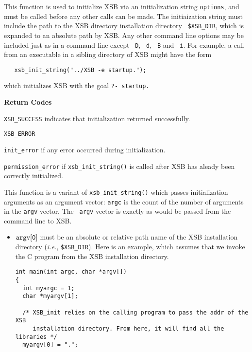 \begin{description}

 This function is used to initialize
XSB via an initialization string {\tt *options}, and must be called
before any other calls can be made.  The initiaization string must
include the path to the XSB directory installation directory {\tt
\$XSB\_DIR}, which is expanded to an absolute path by XSB.  Any other
  command line options may be included just as in a command line
  except {\tt -D}, {\tt -d}, {\tt -B} and {\tt -i}.  For example, a
  call from an executable in a sibling directory of XSB might have the
  form
\begin{verbatim}
   xsb_init_string("../XSB -e startup.");
\end{verbatim}
which initializes XSB with the goal {\tt ?- startup.}

{\bf Return Codes}  
\bi
\item {\tt XSB\_SUCCESS} indicates that initialization returned
  successfully.
%
\item {\tt XSB\_ERROR} 
\bi
\item {\tt init\_error} if any error occurred during initialization. 

\item {\tt permission\_error} if {\tt xsb\_init\_string()} is called
  after XSB has aleady been correctly initialized.  
\ei
%
\ei

 
%
This function is a variant of {\tt xsb\_init\_string()} which passes
initialization arguments as an argument vector: {\tt argc} is the
count of the number of arguments in the {\tt argv} vector.  The {\tt
  argv} vector is exactly as would be passed from the command line to
XSB.
\begin{itemize}
\item $\tt argv[0]$ must be an absolute or relative path name of the XSB
  installation directory ({\it i.e.}, {\tt \$XSB\_DIR}).  Here is an
  example, which assumes that we invoke the C program from the XSB
  installation directory.
    \begin{verbatim}
int main(int argc, char *argv[])
{ 
  int myargc = 1;
  char *myargv[1];

  /* XSB_init relies on the calling program to pass the addr of the XSB
     installation directory. From here, it will find all the libraries */
  myargv[0] = ".";


\end{verbatim}
\end{itemize}
\end{description}
